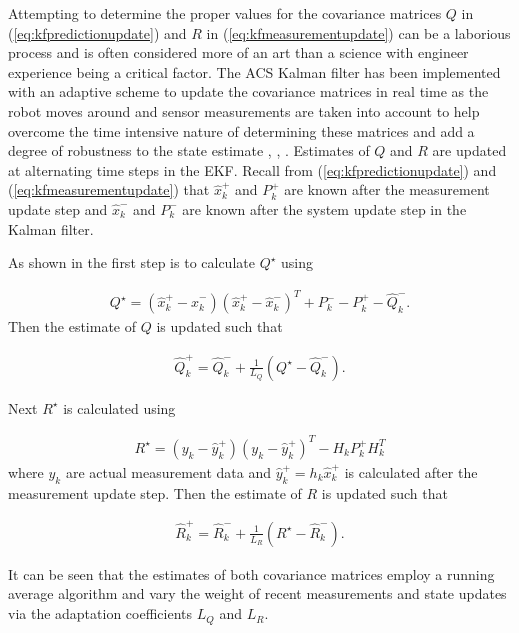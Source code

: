 Attempting to determine the proper values for the covariance matrices $Q$ in (\ref{eq:kfpredictionupdate}) and $R$ in (\ref{eq:kfmeasurementupdate}) can be a laborious process and is often considered more of an art than a science with engineer experience being a critical factor. The ACS Kalman filter has been implemented with an adaptive scheme to update the covariance matrices in real time as the robot moves around and sensor measurements are taken into account to help overcome the time intensive nature of determining these matrices and add a degree of robustness to the state estimate \cite{Sights06}, \cite{Mehra72}, \cite{Busse03adaptiveEKF}. Estimates of $Q$ and $R$ are updated at alternating time steps in the EKF. Recall from (\ref{eq:kfpredictionupdate}) and (\ref{eq:kfmeasurementupdate}) that $\hat{x}_k^+$ and $P_k^+$ are known after the measurement update step and $\hat{x}_k^-$ and $P_k^-$ are known after the system update step in the Kalman filter.

As shown in \cite{Busse03adaptiveEKF} the first step is to calculate $Q^\star$ using

\begin{align*}
Q^\star = \left(\hat{x}_k^+-\hat{x}_k^-\right)\left(\hat{x}_k^+-\hat{x}_k^-\right)^T + P_k^- - P_k^+ - \hat{Q}_k^-.
\end{align*}
Then the estimate of $Q$ is updated such that

\begin{align}
\label{eq:qadapt}
\hat{Q}_k^+ = \hat{Q}_k^- + \frac{1}{L_Q}\left(Q^\star-\hat{Q}_k^-\right).
\end{align}

Next $R^\star$ is calculated using

\begin{align*}
R^\star = \left(y_k-\hat{y}_k^+\right)\left(y_k-\hat{y}_k^+\right)^T - H_kP_k^+H_k^T
\end{align*}
where $y_k$ are actual measurement data and $\hat{y}_k^+ = h_k\hat{x}_k^+$ is calculated after the measurement update step. Then the estimate of $R$ is updated such that

\begin{align}
\label{eq:radapt}
\hat{R}_k^+ = \hat{R}_k^- + \frac{1}{L_R}\left(R^\star-\hat{R}_k^-\right).
\end{align}

It can be seen that the estimates of both covariance matrices employ a running average algorithm and vary the weight of recent measurements and state updates via the adaptation coefficients $L_Q$ and $L_R$.

